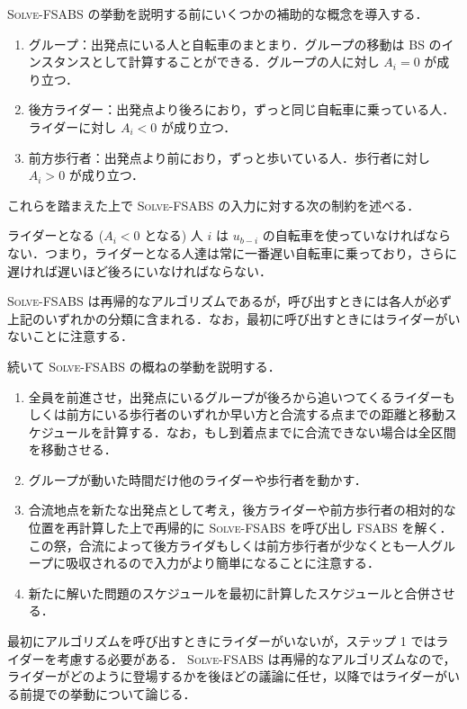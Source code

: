 \textsc{Solve-FSABS} の挙動を説明する前にいくつかの補助的な概念を導入する．
\begin{enumerate}
\item グループ：出発点にいる人と自転車のまとまり．グループの移動は BS のインスタンスとして計算することができる．グループの人に対し $A_i = 0$ が成り立つ．
\item 後方ライダー：出発点より後ろにおり，ずっと同じ自転車に乗っている人．ライダーに対し $A_i < 0$ が成り立つ．
\item 前方歩行者：出発点より前におり，ずっと歩いている人．歩行者に対し $A_i > 0$ が成り立つ．
\end{enumerate}
これらを踏まえた上で \textsc{Solve-FSABS} の入力に対する次の制約を述べる．
\begin{condition}\label{condition:riders-order}
  ライダーとなる ($A_i < 0$ となる) 人 $i$ は $u_{b - i}$ の自転車を使っていなければならない．つまり，ライダーとなる人達は常に一番遅い自転車に乗っており，さらに遅ければ遅いほど後ろにいなければならない．
\end{condition}
\textsc{Solve-FSABS} は再帰的なアルゴリズムであるが，呼び出すときには各人が必ず上記のいずれかの分類に含まれる．なお，最初に呼び出すときにはライダーがいないことに注意する．

続いて \textsc{Solve-FSABS} の概ねの挙動を説明する．
\begin{enumerate}
\item 全員を前進させ，出発点にいるグループが後ろから追いつてくるライダーもしくは前方にいる歩行者のいずれか早い方と合流する点までの距離と移動スケジュールを計算する．なお，もし到着点までに合流できない場合は全区間を移動させる．
\item グループが動いた時間だけ他のライダーや歩行者を動かす．
\item 合流地点を新たな出発点として考え，後方ライダーや前方歩行者の相対的な位置を再計算した上で再帰的に \textsc{Solve-FSABS} を呼び出し FSABS を解く．この祭，合流によって後方ライダもしくは前方歩行者が少なくとも一人グループに吸収されるので入力がより簡単になることに注意する．
\item 新たに解いた問題のスケジュールを最初に計算したスケジュールと合併させる．
\end{enumerate}

最初にアルゴリズムを呼び出すときにライダーがいないが，ステップ 1 ではライダーを考慮する必要がある． \textsc{Solve-FSABS} は再帰的なアルゴリズムなので，ライダーがどのように登場するかを後ほどの議論に任せ，以降ではライダーがいる前提での挙動について論じる．

